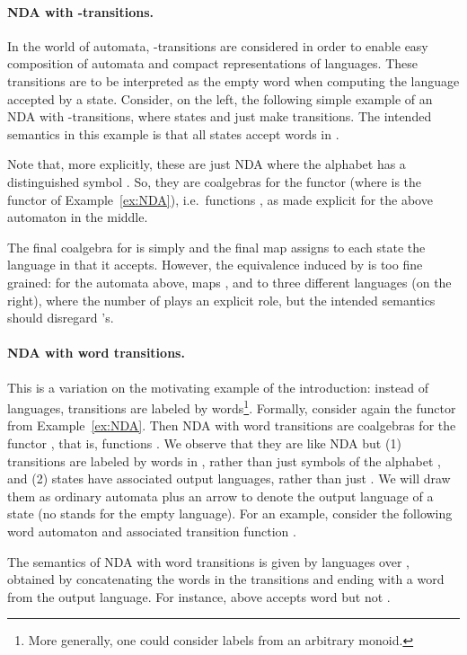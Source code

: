 \documentclass[oribibl,envcountsame,envcountsect,runningheads]{llncs}
\renewcommand{\>}{\rangle}
\begin{document}
\paragraph{NDA with -transitions.} In the world of automata, -transitions are considered in order to enable easy composition of automata and compact representations of languages. These transitions are to be interpreted as the empty word when computing the language accepted by a state. Consider, on the left, the following simple example of an NDA with -transitions, where states  and  just make  transitions. The intended semantics in this example is that  all states accept words in .


Note that, more explicitly, these are just NDA where the alphabet has a distinguished symbol . So, they are coalgebras for the functor  (where  is the functor of Example~\ref{ex:NDA}), i.e.~functions , as made explicit for the above automaton in the middle.

The final coalgebra for  is simply  and the final map  assigns to each state the language in  that it accepts. However, the equivalence induced by  is too fine grained: for the automata above,  maps ,  and  to three different languages (on the right), where the number of  plays an explicit role, but the intended semantics should disregard 's.



\paragraph{NDA with word transitions.} This is a variation on the motivating example of the introduction: instead of languages, transitions are labeled by words\footnote{More generally, one could consider labels from an arbitrary monoid.}. Formally, consider again the functor  from Example~\ref{ex:NDA}. Then NDA with word transitions are coalgebras for the functor , that is, functions . We observe that they are like NDA  but (1) transitions are labeled by words in , rather than just symbols of the alphabet , and (2) states have associated output languages, rather than just . We will draw them as ordinary automata plus an arrow  to denote the output language of a state (no  stands for the empty language). For an example, consider the following word automaton and associated transition function .

The semantics of NDA with word transitions is given by languages over , obtained by concatenating the words in the transitions and ending with a word from the output language. For instance,  above accepts word  but not .
\end{document}
